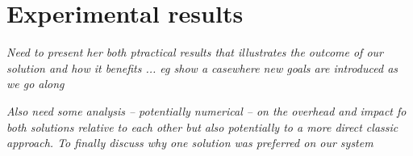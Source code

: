 
\section{Experimental results}
\label{sec:exp}

{\em\color{gray} Need to present her both ptractical results that illustrates the outcome of our solution and how it benefits ... eg show a casewhere new goals are introduced as we go along}

{\em\color{gray} Also need some analysis -- potentially numerical -- on the overhead and impact fo both solutions relative to each other but also potentially to a more direct classic approach. 
To finally discuss why one solution was preferred on our system} 




